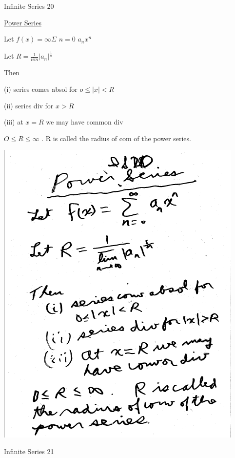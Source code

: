 \documentclass[10pt,a4paper]{article}
\begin{document}
{{\begin{center}
Infinite Series 20

{\underline {Power Series}}

\end{center}

Let $f(x) = \infty \Sigma$ $n=0$ $a_{n}x^{n}$

Let $R = {\frac{1}{lim}}|a_n|^{\frac{1}{n}}$

Then

(i) series comes absol for $o\leq |x|<R$

(ii) series div for ${x}>R$

(iii) at $x=R$ we may have common div

$O\leq R\leq \infty$ . R is called the radius of com of the power series.
\begin{center}

\includegraphics[scale=.7]{Pages/IS_20}

\end{center}

\newpage %

\begin{center}

Infinite Series 21


\end{center}}}
\end{document}

